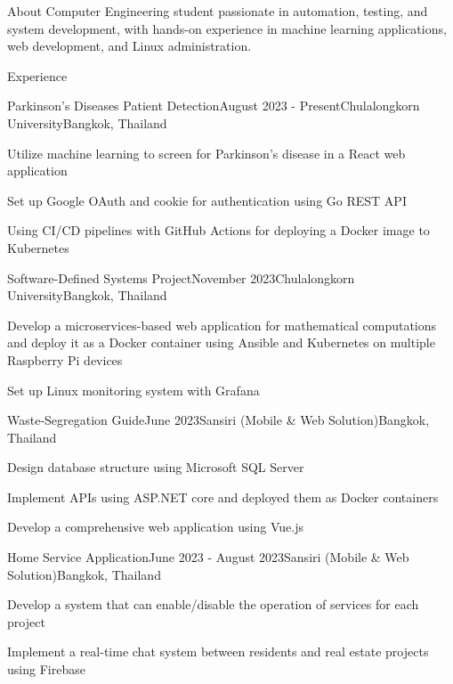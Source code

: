 \documentclass[12pt]{resume}
\begin{document}
\begin{rSection}{About}
    Computer Engineering student passionate in automation, testing, and system development, with hands-on experience in machine learning applications, web development, and Linux administration.
\end{rSection}

\begin{rSection}{Experience}

	\begin{rSubsection}{Parkinson's Diseases Patient Detection}{August 2023 - Present}{Chulalongkorn University}{Bangkok, Thailand}
        \item Utilize machine learning to screen for Parkinson's disease in a React web application
        \item Set up Google OAuth and cookie for authentication using Go REST API
        \item Using CI/CD pipelines with GitHub Actions for deploying a Docker image to Kubernetes
	\end{rSubsection}

	\begin{rSubsection}{Software-Defined Systems Project}{November 2023}{Chulalongkorn University}{Bangkok, Thailand}
        \item Develop a microservices-based web application for mathematical computations and deploy it as a Docker container using Ansible and Kubernetes on multiple Raspberry Pi devices
        \item Set up Linux monitoring system with Grafana
	\end{rSubsection}

	\begin{rSubsection}{Waste-Segregation Guide}{June 2023}{Sansiri (Mobile \& Web Solution)}{Bangkok, Thailand}
        \item Design database structure using Microsoft SQL Server
        \item Implement APIs using ASP.NET core and deployed them as Docker containers
        \item Develop a comprehensive web application using Vue.js
	\end{rSubsection}

    \begin{rSubsection}{Home Service Application}{June 2023 - August 2023}{Sansiri (Mobile \& Web Solution)}{Bangkok, Thailand}
        \item Develop a system that can enable/disable the operation of services for each project
        \item Implement a real-time chat system between residents and real estate projects using Firebase
    \end{rSubsection}

\end{rSection}
\end{document}
